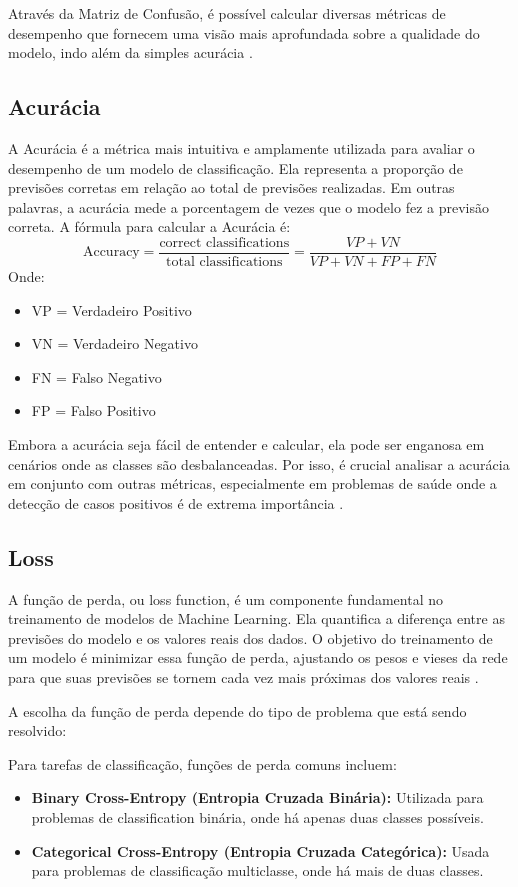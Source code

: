Através da Matriz de Confusão, é possível calcular diversas métricas de desempenho que fornecem uma visão mais aprofundada sobre a qualidade do modelo, indo além da simples acurácia \cite{Pighini2025}.

\subsection{Acurácia}
A Acurácia é a métrica mais intuitiva e amplamente utilizada para avaliar o desempenho de um modelo de classificação. Ela representa a proporção de previsões corretas em relação ao total de previsões realizadas. Em outras palavras, a acurácia mede a porcentagem de vezes que o modelo fez a previsão correta.
A fórmula para calcular a Acurácia é:
$$ \text{Accuracy} = \frac{\text{correct classifications}}{\text{total classifications}} = \frac{VP + VN}{VP+VN+FP+FN} $$
Onde:
\begin{itemize}
    \item VP = Verdadeiro Positivo
    \item VN = Verdadeiro Negativo
    \item FN = Falso Negativo
    \item FP = Falso Positivo
\end{itemize}
Embora a acurácia seja fácil de entender e calcular, ela pode ser enganosa em cenários onde as classes são desbalanceadas. Por isso, é crucial analisar a acurácia em conjunto com outras métricas, especialmente em problemas de saúde onde a detecção de casos positivos é de extrema importância \cite{Hastie2009}.

\subsection{Loss}
A função de perda, ou loss function, é um componente fundamental no treinamento de modelos de Machine Learning. Ela quantifica a diferença entre as previsões do modelo e os valores reais dos dados. O objetivo do treinamento de um modelo é minimizar essa função de perda, ajustando os pesos e vieses da rede para que suas previsões se tornem cada vez mais próximas dos valores reais \cite{Goodfellow2016}.

A escolha da função de perda depende do tipo de problema que está sendo resolvido:

Para tarefas de classificação, funções de perda comuns incluem:
\begin{itemize}
    \item \textbf{Binary Cross-Entropy (Entropia Cruzada Binária):} Utilizada para problemas de classification binária, onde há apenas duas classes possíveis.
    \item \textbf{Categorical Cross-Entropy (Entropia Cruzada Categórica):} Usada para problemas de classificação multiclasse, onde há mais de duas classes.
\end{itemize}

